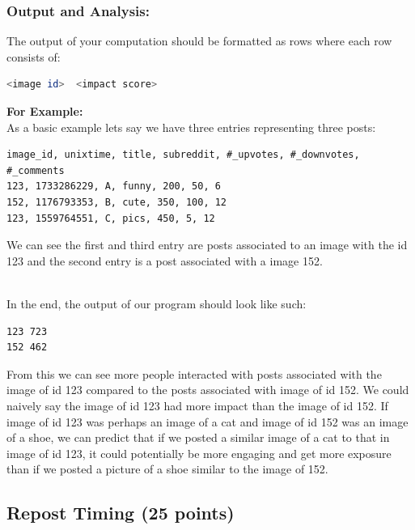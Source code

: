 \documentclass{article}
\begin{document}
\subsubsection*{Output and Analysis:}
The output of your computation should be formatted as rows where each row consists of:
\begin{lstlisting}[language=bash]
                        <image id>  <impact score>
\end{lstlisting}

\noindent \textbf{For Example:}\\
As a basic example lets say we have three entries representing three posts: 

\begin{Verbatim}[frame=single]
image_id, unixtime, title, subreddit, #_upvotes, #_downvotes, #_comments
123, 1733286229, A, funny, 200, 50, 6
152, 1176793353, B, cute, 350, 100, 12
123, 1559764551, C, pics, 450, 5, 12
\end{Verbatim}
We can see the first and third entry are posts associated to an image with the id 123 and the second entry is a post associated with a image 152.


\-\ \\In the end, the output of our program should look like such:
\begin{Verbatim}[frame=single]
123 723
152 462
\end{Verbatim}
From this we can see more people interacted with posts associated with the  image of id 123 compared to the posts associated with image of id 152. We could naively say the image of id 123 had more impact than the image of id 152. If image of id 123 was perhaps an image of a cat and image of id 152 was an image of a shoe, we can predict that if we posted a similar image of a cat to that in image of id 123, it could potentially be more engaging and get more exposure than if we posted a picture of a shoe similar to the image of 152.


\subsection{Repost Timing (25 points)}
\end{document}
